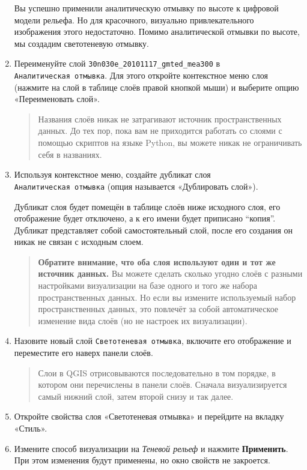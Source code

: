 \documentclass[
  12pt,
]{book}
\begin{document}
\begin{enumerate}
  Вы успешно применили аналитическую отмывку по высоте к цифровой модели рельефа. Но для красочного, визуально привлекательного изображения этого недостаточно. Помимо аналитической отмывки по высоте, мы создадим светотеневую отмывку.
\item
  Переименуйте слой \texttt{30n030e\_20101117\_gmted\_mea300} в \texttt{Аналитическая\ отмывка}. Для этого откройте контекстное меню слоя (нажмите на слой в таблице слоёв правой кнопкой мыши) и выберите опцию «Переименовать слой».

  \begin{quote}
  Названия слоёв никак не затрагивают источник пространственных данных. До тех пор, пока вам не приходится работать со слоями с помощью скриптов на языке Python, вы можете никак не ограничивать себя в названиях.
  \end{quote}
\item
  Используя контекстное меню, создайте дубликат слоя \texttt{Аналитическая\ отмывка} (опция называется «Дублировать слой»).

  Дубликат слоя будет помещён в таблице слоёв ниже исходного слоя, его отображение будет отключено, а к его имени будет приписано ``копия''. Дубликат представляет собой самостоятельный слой, после его создания он никак не связан с исходным слоем.

  \begin{quote}
  \textbf{Обратите внимание, что оба слоя используют один и тот же источник данных.} Вы можете сделать сколько угодно слоёв с разными настройками визуализации на базе одного и того же набора пространственных данных. Но если вы измените используемый набор пространственных данных, это повлечёт за собой автоматическое изменение вида слоёв (но не настроек их визуализации).
  \end{quote}
\item
  Назовите новый слой \texttt{Светотеневая\ отмывка}, включите его отображение и переместите его наверх панели слоёв.

  \begin{quote}
  Слои в QGIS отрисовываются последовательно в том порядке, в котором они перечислены в панели слоёв. Сначала визуализируется самый нижний слой, затем второй снизу и так далее.
  \end{quote}
\item
  Откройте свойства слоя «Светотеневая отмывка» и перейдите на вкладку «Стиль».
\item
  Измените способ визуализации на \emph{Теневой рельеф} и нажмите \textbf{Применить}. При этом изменения будут применены, но окно свойств не закроется.


\end{enumerate}
\end{document}

